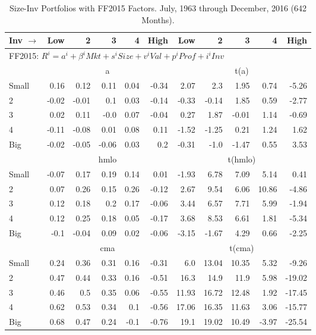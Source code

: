 
\begin{table}[!ht]
\centering
\caption{Size-Inv Portfolios with FF2015 Factors. \footnotesize{July, 1963 through December, 2016 (642 Months).}}
\begin{tabular}{lrrrrrrrrrr}
  \toprule
  Inv $\rightarrow$ & Low & 2 & 3 & 4 & High & Low & 2 & 3 & 4 & High \\ 
  \toprule
  \multicolumn{9}{l}{FF2015: $R^i=a^i+\beta^iMkt+s^iSize+v^iVal+p^iProf+i^iInv$} \\

      & \multicolumn{5}{c}{a} & \multicolumn{5}{c}{t(a)} \\
    \cmidrule(r){2-6} \cmidrule(r){7-11}
      Small  & 0.16  & 0.12  & 0.11  & 0.04  & -0.34   & 2.07  & 2.3  & 1.95  & 0.74  & -5.26  \\
          2  & -0.02  & -0.01  & 0.1  & 0.03  & -0.14   & -0.33  & -0.14  & 1.85  & 0.59  & -2.77  \\
          3  & 0.02  & 0.11  & -0.0  & 0.07  & -0.04   & 0.27  & 1.87  & -0.01  & 1.14  & -0.69  \\
          4  & -0.11  & -0.08  & 0.01  & 0.08  & 0.11   & -1.52  & -1.25  & 0.21  & 1.24  & 1.62  \\
      Big    & -0.02  & -0.05  & -0.06  & 0.03  & 0.2   & -0.31  & -1.0  & -1.47  & 0.55  & 3.53  \\

      & \multicolumn{5}{c}{hmlo} & \multicolumn{5}{c}{t(hmlo)} \\
    \cmidrule(r){2-6} \cmidrule(r){7-11}
      Small  & -0.07  & 0.17  & 0.19  & 0.14  & 0.01   & -1.93  & 6.78  & 7.09  & 5.14  & 0.41  \\
          2  & 0.07  & 0.26  & 0.15  & 0.26  & -0.12   & 2.67  & 9.54  & 6.06  & 10.86  & -4.86  \\
          3  & 0.12  & 0.18  & 0.2  & 0.17  & -0.06   & 3.44  & 6.57  & 7.71  & 5.99  & -1.94  \\
          4  & 0.12  & 0.25  & 0.18  & 0.05  & -0.17   & 3.68  & 8.53  & 6.61  & 1.81  & -5.34  \\
      Big    & -0.1  & -0.04  & 0.09  & 0.02  & -0.06   & -3.15  & -1.67  & 4.29  & 0.66  & -2.25  \\

      & \multicolumn{5}{c}{cma} & \multicolumn{5}{c}{t(cma)} \\
    \cmidrule(r){2-6} \cmidrule(r){7-11}
      Small  & 0.24  & 0.36  & 0.31  & 0.16  & -0.31   & 6.0  & 13.04  & 10.35  & 5.32  & -9.26  \\
          2  & 0.47  & 0.44  & 0.33  & 0.16  & -0.51   & 16.3  & 14.9  & 11.9  & 5.98  & -19.02  \\
          3  & 0.46  & 0.5  & 0.35  & 0.06  & -0.55   & 11.93  & 16.72  & 12.48  & 1.92  & -17.45  \\
          4  & 0.62  & 0.53  & 0.34  & 0.1  & -0.56   & 17.06  & 16.35  & 11.63  & 3.06  & -15.77  \\
      Big    & 0.68  & 0.47  & 0.24  & -0.1  & -0.76   & 19.1  & 19.02  & 10.49  & -3.97  & -25.54  \\

  

  \bottomrule
\end{tabular}
\label{tbl:25_Size_Inv_FF2015}
\end{table}